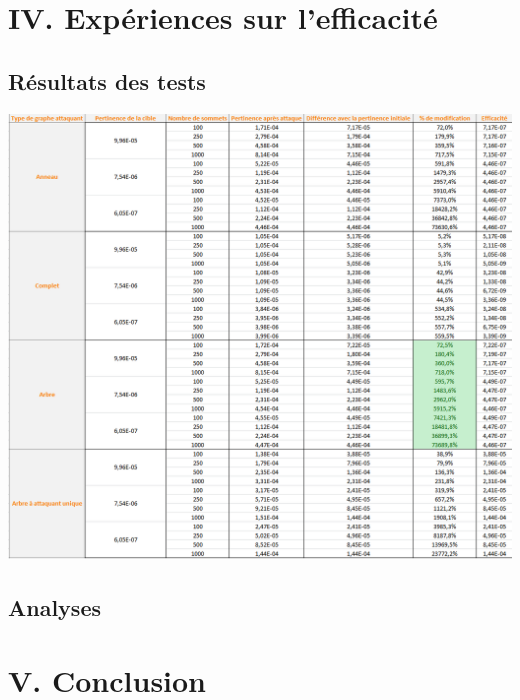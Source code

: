 \documentclass[a4paper,11pt]{article}
\begin{document}
\section{IV.	Expériences sur l'efficacité}
	\subsection{Résultats des tests}
		\includegraphics[scale = 0.6]{Captures/ranking5.PNG}\\
	\subsection{Analyses}
	
\section{V.		Conclusion}
\end{document}
